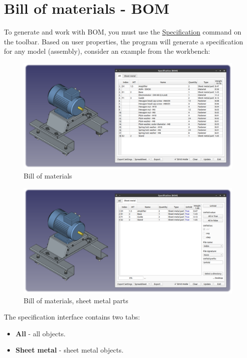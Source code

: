 \documentclass[a4paper,12pt]{article}
\begin{document}
\pagebreak



\section{Bill of materials - BOM}
To generate and work with BOM, you must use the \hyperref[sec:4]{Specification} command on the toolbar. Based on user properties, the program will generate a specification for any model (assembly), consider an example from the workbench:

\begin{figure}[htp]
\centering
\includegraphics[width=1.0\textwidth]{img/specification_all.png}
\caption{Bill of materials}
\label{sec:specification_all}
\end{figure}

\begin{figure}[htp]
\centering
\includegraphics[width=1.0\textwidth]{img/specification_sm.png}
\caption{Bill of materials, sheet metal parts}
\label{sec:specification_sm}
\end{figure}

\begin{flushleft}The specification interface contains two tabs:\end{flushleft}
\begin{itemize}
	\item \textbf{All} - all objects.
	\item \textbf{Sheet metal} - sheet metal objects.
\end{itemize}
\end{document}
